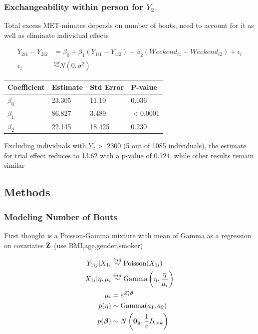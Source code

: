 \documentclass[handout]{beamer}\usepackage[]{graphicx}\usepackage[]{color}
\begin{document}
\begin{frame}
\frametitle{Exchangeability within person for $Y_2$}
Total excess MET-minutes depends on number of bouts, need to account for it as well as eliminate individual effects

\begin{align*}
Y_{2i1}-Y_{2i2} &= \beta_0 + \beta_1(Y_{1i1}-Y_{1i2}) + \beta_2(Weekend_{i1}-Weekend_{i2}) + \epsilon_i \\
\epsilon_i &\overset{iid}{\sim} N(0,\sigma^2)
\end{align*}

\begin{table}[!htbp] \centering 
\begin{tabular}{l|lll}
\hline
Coefficient & Estimate & Std Error & P-value \\
\hline
$\beta_0$ & 23.305 & 11.10 & 0.036 \\
$\beta_1$ & 86.827 & 3.489 & $<$0.0001 \\
$\beta_2$ & 22.145 & 18.425 & 0.230 \\
\hline
\end{tabular} 
\end{table} 


Excluding individuals with $Y_2 >$ 2300 (5 out of 1085 individuals), the estimate for trial effect  reduces to 13.62 with a p-value of 0.124, while other results remain similar

\end{frame}

\subsection{Methods}

\begin{frame}
\frametitle{Modeling Number of Bouts}
First thought is a Poisson-Gamma mixture with mean of Gamma as a regression on covariates ${\bf Z}$ (use BMI,age,gender,smoker)

\begin{align*}
	Y_{1ij} | X_{1i} &\overset{ind}{\sim} \text{Poisson}(X_{1i}) \\
	X_{1i} | \eta,\mu_i &\overset{ind}{\sim} \text{Gamma} \left( \eta,\frac{\eta}{\mu_i} \right) \\
	\mu_i &= e^{Z_i' \boldsymbol{\beta}} \\
	p(\eta) &\sim \text{Gamma}(a_1,a_2) \\
	p(\boldsymbol{\beta}) &\sim N \left( {\bf 0_k}, \frac{1}{v} I_{k \times k} \right)
\end{align*}

\end{frame}
\end{document}
